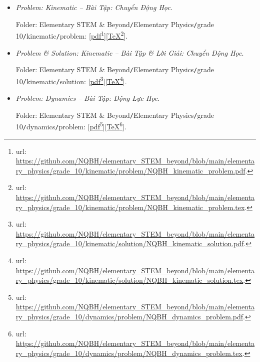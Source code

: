 \documentclass[12pt]{article}
\begin{document}
\begin{itemize}
	\item {\it Problem: Kinematic -- Bài Tập: Chuyển Động Học}.
	
	Folder: {\sf Elementary STEM \& Beyond{\tt/}Elementary Physics{\tt/}grade 10{\tt/}kinematic{\tt/}problem}: [\href{https://github.com/NQBH/elementary_STEM_beyond/blob/main/elementary_physics/grade_10/kinematic/problem/NQBH_kinematic_problem.pdf}{pdf}\footnote{{\sc url}: \url{https://github.com/NQBH/elementary_STEM_beyond/blob/main/elementary_physics/grade_10/kinematic/problem/NQBH_kinematic_problem.pdf}.}][\href{https://github.com/NQBH/elementary_STEM_beyond/blob/main/elementary_physics/grade_10/kinematic/problem/NQBH_kinematic_problem.tex}{\TeX}\footnote{{\sc url}: \url{https://github.com/NQBH/elementary_STEM_beyond/blob/main/elementary_physics/grade_10/kinematic/problem/NQBH_kinematic_problem.tex}.}].
	\item {\it Problem \& Solution: Kinematic -- Bài Tập \& Lời Giải: Chuyển Động Học}.
	
	Folder: {\sf Elementary STEM \& Beyond{\tt/}Elementary Physics{\tt/}grade 10{\tt/}kinematic{\tt/}solution}: [\href{https://github.com/NQBH/elementary_STEM_beyond/blob/main/elementary_physics/grade_10/kinematic/solution/NQBH_kinematic_solution.pdf}{pdf}\footnote{{\sc url}: \url{https://github.com/NQBH/elementary_STEM_beyond/blob/main/elementary_physics/grade_10/kinematic/solution/NQBH_kinematic_solution.pdf}.}][\href{https://github.com/NQBH/elementary_STEM_beyond/blob/main/elementary_physics/grade_10/kinematic/solution/NQBH_kinematic_solution.tex}{\TeX}\footnote{{\sc url}: \url{https://github.com/NQBH/elementary_STEM_beyond/blob/main/elementary_physics/grade_10/kinematic/solution/NQBH_kinematic_solution.tex}.}].
	\item {\it Problem: Dynamics -- Bài Tập: Động Lực Học}.
	
	Folder: {\sf Elementary STEM \& Beyond{\tt/}Elementary Physics{\tt/}grade 10{\tt/}dynamics{\tt/}problem}: [\href{https://github.com/NQBH/elementary_STEM_beyond/blob/main/elementary_physics/grade_10/dynamics/problem/NQBH_dynamics_problem.pdf}{pdf}\footnote{{\sc url}: \url{https://github.com/NQBH/elementary_STEM_beyond/blob/main/elementary_physics/grade_10/dynamics/problem/NQBH_dynamics_problem.pdf}.}][\href{https://github.com/NQBH/elementary_STEM_beyond/blob/main/elementary_physics/grade_10/dynamics/problem/NQBH_dynamics_problem.tex}{\TeX}\footnote{{\sc url}: \url{https://github.com/NQBH/elementary_STEM_beyond/blob/main/elementary_physics/grade_10/dynamics/problem/NQBH_dynamics_problem.tex}.}].
	

\end{itemize}
\end{document}
